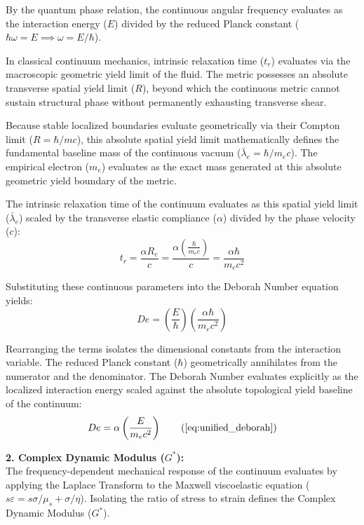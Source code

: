\documentclass[11pt, a4paper]{article}
\begin{document}
By the quantum phase relation, the continuous angular frequency evaluates as the interaction energy ($E$) divided by the reduced Planck constant ($\hbar \omega = E \implies \omega = E/\hbar$). 

In classical continuum mechanics, intrinsic relaxation time ($t_r$) evaluates via the macroscopic geometric yield limit of the fluid. The metric possesses an absolute transverse spatial yield limit ($R$), beyond which the continuous metric cannot sustain structural phase without permanently exhausting transverse shear. 

Because stable localized boundaries evaluate geometrically via their Compton limit ($R = \hbar/mc$), this absolute spatial yield limit mathematically defines the fundamental baseline mass of the continuous vacuum ($\bar{\lambda}_e = \hbar/m_e c$). The empirical electron ($m_e$) evaluates as the exact mass generated at this absolute geometric yield boundary of the metric.

The intrinsic relaxation time of the continuum evaluates as this spatial yield limit ($\bar{\lambda}_e$) scaled by the transverse elastic compliance ($\alpha$) divided by the phase velocity ($c$):
\begin{equation}
    t_r = \frac{\alpha R_e}{c} = \frac{\alpha \left(\frac{\hbar}{m_e c}\right)}{c} = \frac{\alpha \hbar}{m_e c^2} 
\end{equation}

Substituting these continuous parameters into the Deborah Number equation yields:
\begin{equation}
    De = \left( \frac{E}{\hbar} \right) \left( \frac{\alpha \hbar}{m_e c^2} \right) 
\end{equation}

Rearranging the terms isolates the dimensional constants from the interaction variable. The reduced Planck constant ($\hbar$) geometrically annihilates from the numerator and the denominator. The Deborah Number evaluates explicitly as the localized interaction energy scaled against the absolute topological yield baseline of the continuum:
\begin{equation}
    De = \alpha \left( \frac{E}{m_e c^2} \right) \tag{\ref{eq:unified_deborah}}
\end{equation}

\textbf{2. Complex Dynamic Modulus ($G^*$):} \\
The frequency-dependent mechanical response of the continuum evaluates by applying the Laplace Transform to the Maxwell viscoelastic equation ($s \varepsilon = s \sigma / \mu_s + \sigma / \eta$). Isolating the ratio of stress to strain defines the Complex Dynamic Modulus ($G^*$). 
\end{document}
